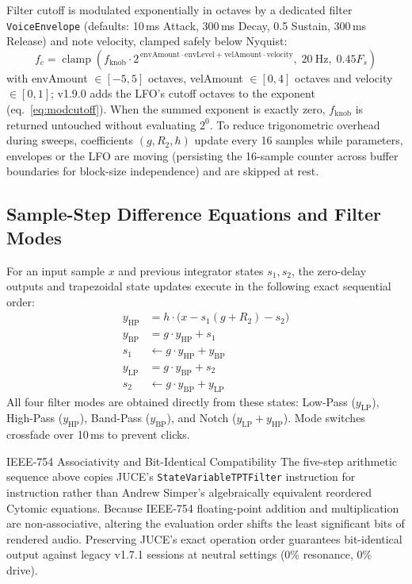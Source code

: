 \documentclass[11pt,letterpaper]{article}
\newcommand{\code}[1]{\texttt{\textcolor{codegray}{#1}}}
\newcommand{\Fs}{F_s}
\newcommand{\clamp}{\operatorname{clamp}}
\begin{document}
Filter cutoff is modulated exponentially in octaves by a dedicated filter \code{VoiceEnvelope} (defaults: 10\,ms Attack,
300\,ms Decay, 0.5 Sustain, 300\,ms Release) and note velocity, clamped safely below Nyquist:
\begin{equation}\label{eq:cutoff}
  f_c = \clamp\!\left(f_{\mathrm{knob}} \cdot 2^{\,\mathrm{envAmount}\cdot\mathrm{envLevel} + \mathrm{velAmount}\cdot\mathrm{velocity}},\; 20\ \mathrm{Hz},\; 0.45\Fs\right)
\end{equation}
with envAmount $\in[-5,5]$ octaves, velAmount $\in[0,4]$ octaves and velocity $\in[0,1]$; v1.9.0 adds the LFO's cutoff octaves
to the exponent (eq.~\eqref{eq:modcutoff}). When the summed exponent is exactly zero, $f_{\mathrm{knob}}$ is returned untouched without
evaluating $2^0$. To reduce trigonometric
overhead during sweeps, coefficients $(g, R_2, h)$ update every 16 samples while parameters, envelopes or the LFO are moving
(persisting the 16-sample counter across buffer boundaries for block-size independence) and are skipped at rest.

\subsection{Sample-Step Difference Equations and Filter Modes}

For an input sample $x$ and previous integrator states $s_1, s_2$, the zero-delay outputs and trapezoidal state updates
execute in the following exact sequential order:
\begin{equation}\label{eq:svf}
\begin{aligned}
  y_{\mathrm{HP}} &= h \cdot \bigl(x - s_1(g + R_2) - s_2\bigr)\\
  y_{\mathrm{BP}} &= g \cdot y_{\mathrm{HP}} + s_1\\
  s_1 &\leftarrow g \cdot y_{\mathrm{HP}} + y_{\mathrm{BP}}\\
  y_{\mathrm{LP}} &= g \cdot y_{\mathrm{BP}} + s_2\\
  s_2 &\leftarrow g \cdot y_{\mathrm{BP}} + y_{\mathrm{LP}}
\end{aligned}
\end{equation}
All four filter modes are obtained directly from these states: Low-Pass ($y_{\mathrm{LP}}$), High-Pass ($y_{\mathrm{HP}}$), Band-Pass ($y_{\mathrm{BP}}$), and
Notch ($y_{\mathrm{LP}} + y_{\mathrm{HP}}$). Mode switches crossfade over 10\,ms to prevent clicks.

\begin{callout}{IEEE-754 Associativity and Bit-Identical Compatibility}
The five-step arithmetic sequence above copies JUCE's \code{StateVariableTPTFilter} instruction for
instruction rather than Andrew Simper's algebraically equivalent reordered Cytomic equations. Because
IEEE-754 floating-point addition and multiplication are non-associative, altering the evaluation order shifts
the least significant bits of rendered audio. Preserving JUCE's exact operation order guarantees bit-identical
output against legacy v1.7.1 sessions at neutral settings (0\% resonance, 0\% drive).
\end{callout}
\end{document}
